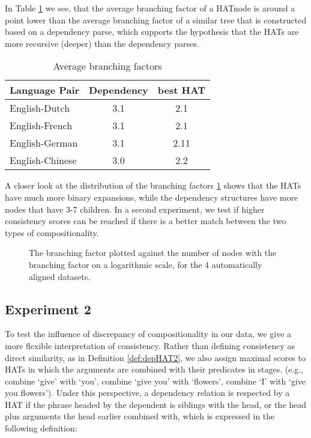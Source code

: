 In Table \ref{tab:branching} we see, that the average branching factor of a HATnode is around a point lower than the average branching factor of a similar tree that is constructed based on a dependency parse, which supports the hypothesis that the HATs are more recursive (deeper) than the dependency parses.

\begin{table}[!ht]
\centering
\begin{tabular}{|l|c|c|}
\hline\textbf{Language Pair} & \textbf{Dependency} &\textbf{best HAT}\\
\hline \hline
English-Dutch & 3.1 & 2.1 \\
\hline
English-French & 3.1 & 2.1 \\
\hline
English-German & 3.1 & 2.11 \\
\hline
English-Chinese & 3.0 & 2.2\\
\hline
\end{tabular}
\caption{Average branching factors}\label{tab:branching}
\end{table}

A closer look at the distribution of the branching factors \ref{fig:branching} shows that the HATs have much more binary expansions, while the dependency structures have more nodes that have 3-7 children. In a second experiment, we test if higher consistency scores can be reached if there is a better match between the two types of compositionality.

\begin{figure}[!ht]

\caption{The branching factor plotted against the number of nodes with the branching factor on a logarithmic scale, for the 4 automatically aligned datasets.}\label{fig:branching}
\end{figure}


\subsection{Experiment 2}

To test the influence of discrepancy of compositionality in our data, we give a more flexible interpretation of consistency. Rather than defining consistency as direct similarity, as in Definition \ref{def:depHAT2}, we also assign maximal scores to HATs in which the arguments are combined with their predicates in stages. (e.g., combine `give' with `you', combine `give you' with `flowers', combine `I' with `give you flowers'). Under this perspective, a dependency relation is respected by a HAT if the phrase headed by the dependent is siblings with the head, or the head plus arguments the head earlier combined with, which is expressed in the following definition:

